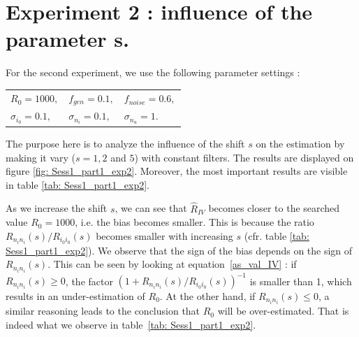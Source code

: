\section{Experiment 2 : influence of the parameter s.}
For the second experiment, we use the following parameter settings : 
\begin{table}[h]
\centering
\begin{tabular}{lll}
    $ R_0 = 1000, $  &  $ f_{gen} = 0.1, $ & $ f_{noise} = 0.6 ,$  \\
    $ \sigma_{i_0} = 0.1, $  &  $ \sigma_{n_i} = 0.1, $ & $ \sigma_{n_u} = 1.$  \\
\end{tabular}
\end{table}

The purpose here is to analyze the influence of the shift $s$ on the estimation by making it vary ($s = 1, 2$ and $5$) with constant filters. The results are displayed on figure \ref{fig: Sess1_part1_exp2}. Moreover, the most important results are visible in table \ref{tab: Sess1_part1_exp2}. 

As we increase the shift $s$, we can see that $\hat{R}_{IV}$ becomes closer to the searched value $R_0 = 1000$, i.e. the bias becomes smaller. This is because the ratio $R_{n_i n_i}(s)/R_{i_0 i_0}(s)$ becomes smaller with increasing $s$ (cfr. table \ref{tab: Sess1_part1_exp2}). We observe that the sign of the bias depends on the sign of $R_{n_i n_i}(s)$. This can be seen by looking at equation~\ref{as_val_IV} : if $R_{n_i n_i}(s) \ge 0$, the factor $(1+R_{n_i n_i}(s)/R_{i_0 i_0}(s))^{-1}$ is smaller than 1, which results in an under-estimation of $R_0$. At the other hand, if $R_{n_i n_i}(s) \le 0$, a similar reasoning leads to the conclusion that $R_0$ will be over-estimated. That is indeed what we observe in table~\ref{tab: Sess1_part1_exp2}.

